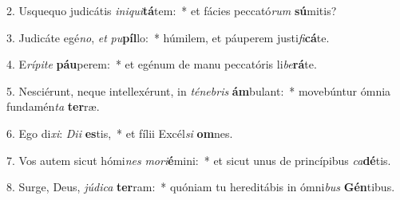 2. Usquequo judicátis \textit{in}\textit{i}\textit{qui}\textbf{tá}tem:~*  et fácies peccató\textit{rum} \textbf{sú}mitis?\

3. Judicáte egé\textit{no}, \textit{et} \textit{pu}\textbf{píl}lo:~*  húmilem, et páuperem justi\textit{fi}\textbf{cá}te.\

4. E\textit{rí}\textit{pi}\textit{te} \textbf{páu}perem:~*  et egénum de manu peccatóris li\textit{be}\textbf{rá}te.\

5. Nesciérunt, neque intellexérunt, in \textit{té}\textit{ne}\textit{bris} \textbf{ám}bulant:~*  movebúntur ómnia fundamén\textit{ta} \textbf{ter}ræ.\

6. Ego di\textit{xi}: \textit{Di}\textit{i} \textbf{es}tis,~*  et fílii Excél\textit{si} \textbf{om}nes.\

7. Vos autem sicut hómi\textit{nes} \textit{mo}\textit{ri}\textbf{é}mini:~*  et sicut unus de princípibus \textit{ca}\textbf{dé}tis.\

8. Surge, Deus, \textit{jú}\textit{di}\textit{ca} \textbf{ter}ram:~*  quóniam tu hereditábis in ómni\textit{bus} \textbf{Gén}tibus.\

